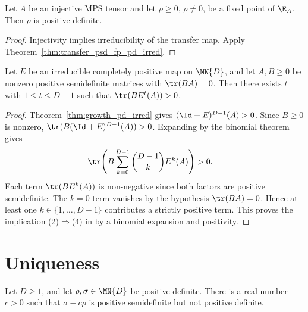\begin{theorem}
    \label{thm:psd_fp_pd}
    \leanok
    Let $A$ be an injective MPS tensor and let $\rho \ge 0$,
    $\rho \neq 0$, be a fixed point of $\E_A$. Then $\rho$ is positive
    definite.
\end{theorem}

\begin{proof}\leanok
    Injectivity implies irreducibility of the transfer map. Apply
    Theorem~\ref{thm:transfer_psd_fp_pd_irred}.
\end{proof}

\begin{theorem}\label{thm:orthogonal_trace_cond}
    \leanok
    Let $E$ be an irreducible completely positive map on $\MN{D}$,
    and let $A, B \ge 0$ be nonzero positive semidefinite matrices
    with $\tr(BA) = 0$.
    Then there exists $t$ with $1 \le t \le D - 1$ such that
    $\tr(BE^t(A)) > 0$.
\end{theorem}

\begin{proof}
    \leanok
    Theorem~\ref{thm:growth_pd_irred} gives
    $(\Id + E)^{D-1}(A) > 0$.
    Since $B \ge 0$ is nonzero,
    $\tr(B(\Id + E)^{D-1}(A)) > 0$.
    Expanding by the binomial theorem gives
    \begin{align}
        \tr\!\left(B\sum_{k=0}^{D-1}\binom{D-1}{k}E^k(A)\right)
         & > 0.
        \notag
    \end{align}
    Each term $\tr(BE^k(A))$ is non-negative since both factors are
    positive semidefinite.
    The $k = 0$ term vanishes by the hypothesis $\tr(BA) = 0$.
    Hence at least one $k \in \{1,\ldots,D-1\}$ contributes
    a strictly positive term.
    This proves the implication (2)$\Rightarrow$(4) in
    \cite[Theorem~6.2(4)]{Wolf2012Quantum} by a binomial expansion and
    positivity.
\end{proof}

\section{Uniqueness}

\begin{lemma}
    \label{lem:critical_scalar_posdef}
    \leanok
    Let $D\geq1$, and let $\rho,\sigma\in\MN{D}$ be positive definite. There
    is a real number $c>0$ such that $\sigma-c\rho$ is positive semidefinite
    but not positive definite.
\end{lemma}

